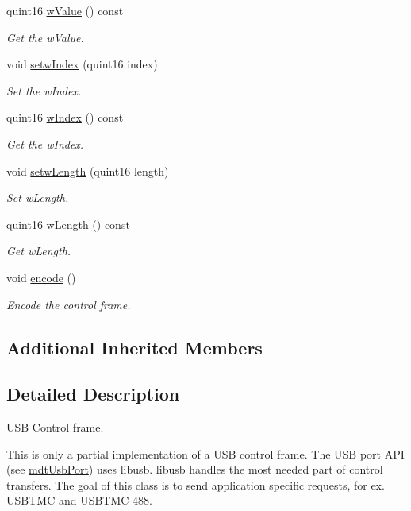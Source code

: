 \begin{DoxyCompactItemize}
quint16 \hyperlink{classmdt_frame_usb_control_a0ab37031950ec1fab8031953b5b815fd}{w\-Value} () const 
\begin{DoxyCompactList}\small\item\em Get the w\-Value. \end{DoxyCompactList}\item 
void \hyperlink{classmdt_frame_usb_control_ab0501a5ece1a908622fa503cde190c7f}{setw\-Index} (quint16 index)
\begin{DoxyCompactList}\small\item\em Set the w\-Index. \end{DoxyCompactList}\item 
quint16 \hyperlink{classmdt_frame_usb_control_aff3d13dbedafdcacc1541f7c7743ae16}{w\-Index} () const 
\begin{DoxyCompactList}\small\item\em Get the w\-Index. \end{DoxyCompactList}\item 
void \hyperlink{classmdt_frame_usb_control_ad6cb34c3587abe7db45977d16fc0c058}{setw\-Length} (quint16 length)
\begin{DoxyCompactList}\small\item\em Set w\-Length. \end{DoxyCompactList}\item 
quint16 \hyperlink{classmdt_frame_usb_control_a4c69a912c9ef404fb5f019698d676e52}{w\-Length} () const 
\begin{DoxyCompactList}\small\item\em Get w\-Length. \end{DoxyCompactList}\item 
void \hyperlink{classmdt_frame_usb_control_af60cb9e9fd8cb55fc44d696fce0331c0}{encode} ()
\begin{DoxyCompactList}\small\item\em Encode the control frame. \end{DoxyCompactList}\end{DoxyCompactItemize}
\subsection*{Additional Inherited Members}


\subsection{Detailed Description}
U\-S\-B Control frame. 

This is only a partial implementation of a U\-S\-B control frame. The U\-S\-B port A\-P\-I (see \hyperlink{classmdt_usb_port}{mdt\-Usb\-Port}) uses libusb. libusb handles the most needed part of control transfers. The goal of this class is to send application specific requests, for ex. U\-S\-B\-T\-M\-C and U\-S\-B\-T\-M\-C 488.


